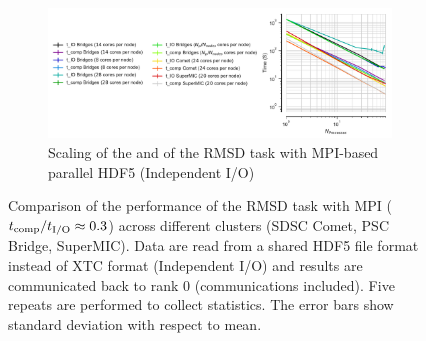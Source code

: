\begin{figure}[ht!]
\begin{subfigure} {.8\textwidth}
  \includegraphics[width=\linewidth]{figures/Clusters_IO_compute_scaling.pdf}
  \caption{Scaling of the \tcomp and \tIO of the RMSD task with MPI-based parallel HDF5 (Independent I/O)}
  \label{fig:compute-IO-scaling-clusters}
\end{subfigure}
%
\caption{Comparison of the performance of the RMSD task with MPI (${t}_{\text{comp}}/{t}_{\text{I/O}} \approx 0.3$)
across different clusters (SDSC Comet, PSC Bridge, SuperMIC). Data are read from a shared HDF5 file format instead of XTC format (Independent I/O)
and results are communicated back to rank 0 (communications included). Five repeats are performed to 
collect statistics. The error bars show standard deviation with respect to mean.}
\label{fig:MPIwithIO-clusters}
\end{figure} 

